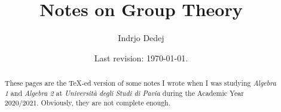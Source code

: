 



\title{Notes on Group Theory}
\author{Indrjo Dedej}
\date{Last revision: \today{}.}



\maketitle

\begin{abstract}
These pages are the \TeX{}-ed version of some notes I wrote when I was studying {\em Algebra 1} and {\em Algebra 2} at {\em Università degli Studi di Pavia} during the Academic Year 2020/2021. Obviously, they are not complete enough.
\end{abstract}

\tableofcontents













